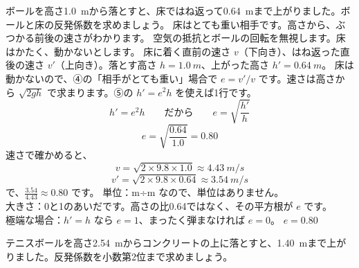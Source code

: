 \label{ph:力-3:ex8}
\begin{phreidai}[弾む高さから反発係数を求める]
ボールを高さ\qty{1.0}{m}から落とすと、床ではね返って\qty{0.64}{m}まで上がりました。ボールと床の反発係数を求めましょう。
\phbamen
床はとても重い相手です。高さから、ぶつかる前後の速さがわかります。
\phmushi
空気の抵抗とボールの回転を無視します。床はかたく、動かないとします。
\phzu
床に着く直前の速さ $v$（下向き）、はね返った直後の速さ $v'$（上向き）。落とす高さ $h=\qty{1.0}{m}$、上がった高さ $h'=\qty{0.64}{m}$。
\phriyu
床は動かないので、④の「相手がとても重い」場合で $e=v'/v$ です。速さは高さから $\sqrt{2gh}$ で求まります。⑤の $h'=e^2h$ を使えば1行です。
\phtateru
\[h'=e^2h\qquad\text{だから}\qquad e=\sqrt{\frac{h'}{h}}\]
\phtoku
\[e=\sqrt{\frac{0.64}{1.0}}=0.80\]
速さで確かめると、
\[v=\sqrt{2\times9.8\times1.0}\approx\qty{4.43}{m/s}\]
\[v'=\sqrt{2\times9.8\times0.64}\approx\qty{3.54}{m/s}\]
で、$\tfrac{3.54}{4.43}\approx0.80$ です。
\phtashikame
単位：m÷m なので、単位はありません。\\
大きさ：0と1のあいだです。高さの比0.64ではなく、その平方根が $e$ です。\\
極端な場合：$h'=h$ なら $e=1$、まったく弾まなければ $e=0$。
\kotae $e=0.80$
\end{phreidai}
\begin{jibun}
テニスボールを高さ\qty{2.54}{m}からコンクリートの上に落とすと、\qty{1.40}{m}まで上がりました。反発係数を小数第2位まで求めましょう。
\end{jibun}

